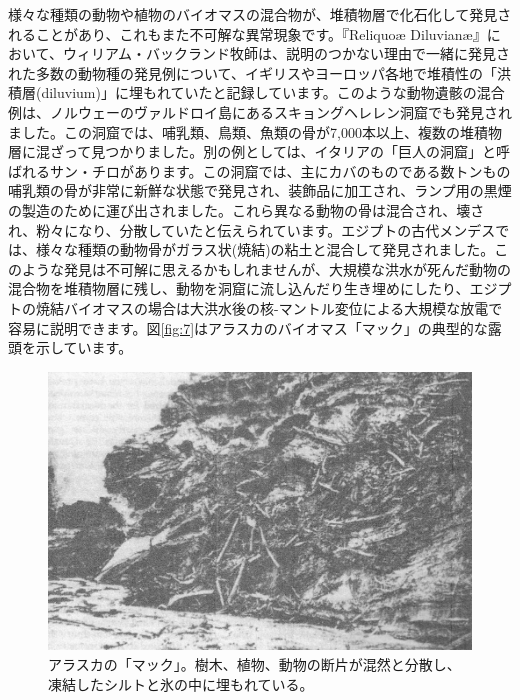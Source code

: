 \documentclass[10pt,twocolumn,letterpaper]{article}
\begin{document}
様々な種類の動物や植物のバイオマスの混合物が、堆積物層で化石化して発見されることがあり、これもまた不可解な異常現象です。『Reliquoæ Diluvianæ』において、ウィリアム・バックランド牧師は、説明のつかない理由で一緒に発見された多数の動物種の発見例について、イギリスやヨーロッパ各地で堆積性の「洪積層(diluvium)」に埋もれていたと記録しています\cite{58}。このような動物遺骸の混合例は、ノルウェーのヴァルドロイ島にあるスキョングヘレレン洞窟でも発見されました。この洞窟では、哺乳類、鳥類、魚類の骨が7,000本以上、複数の堆積物層に混ざって見つかりました\cite{59}。別の例としては、イタリアの「巨人の洞窟」と呼ばれるサン・チロがあります。この洞窟では、主にカバのものである数トンもの哺乳類の骨が非常に新鮮な状態で発見され、装飾品に加工され、ランプ用の黒煙の製造のために運び出されました。これら異なる動物の骨は混合され、壊され、粉々になり、分散していたと伝えられています\cite{60,61}。エジプトの古代メンデスでは、様々な種類の動物骨がガラス状(焼結)の粘土と混合して発見されました\cite{57}。このような発見は不可解に思えるかもしれませんが、大規模な洪水が死んだ動物の混合物を堆積物層に残し、動物を洞窟に流し込んだり生き埋めにしたり、エジプトの焼結バイオマスの場合は大洪水後の核-マントル変位による大規模な放電で容易に説明できます。図\ref{fig:7}はアラスカのバイオマス「マック」の典型的な露頭を示しています\cite{56}。

\begin{figure}[t]
\begin{center}
   \includegraphics[width=1\linewidth]{muck-crop.jpeg}
\end{center}
   \caption{アラスカの「マック」。樹木、植物、動物の断片が混然と分散し、凍結したシルトと氷の中に埋もれている\cite{146}。}
\label{fig:7}
\label{fig:onecol}
\end{figure}
\end{document}
